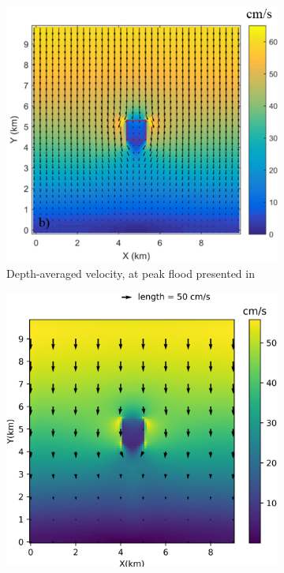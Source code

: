 \documentclass[12pt]{article}
\begin{document}
\begin{figure}[h]
\centering
\begin{subfigure}{.5\textwidth}
  \centering
  \includegraphics[scale=0.17]{plots/depth_averaged_vel_full.jpg}
  \caption{Depth-averaged velocity, at peak flood presented in \textcite{Beudin2017}}
  \label{fig:depth_avg_vel_1}
\end{subfigure}%
\begin{subfigure}{.5\textwidth}
  \centering
  \includegraphics[scale=0.55]{plots/depth_averaged_vel_veg_test.png}

\end{subfigure}
\end{figure}
\end{document}
